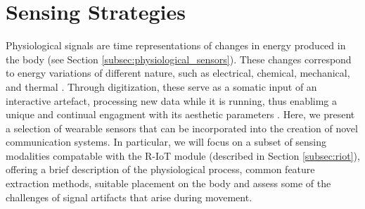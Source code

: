 %
%

\section{Sensing Strategies}
\label{sec:sensing}

Physiological signals are time representations of changes in energy produced in the body (see Section \ref{subsec:physiological_sensors}). These changes correspond to energy variations of different nature, such as electrical, chemical, mechanical, and thermal \cite{semmlow_biosignal_2014}. Through digitization, these serve as a somatic input of an interactive artefact, processing new data while it is running, thus enablimg a unique and continual engagment with its aesthetic parameters \cite{carvalhais_art_2022}. Here, we present a selection of wearable sensors that can be incorporated into the creation of novel communication systems. In particular, we will focus on a subset of sensing modalities compatable with the R-IoT module (described in Section \ref{subsec:riot}), offering a brief description of the physiological process, common feature extraction methods, suitable placement on the body and assess some of the challenges of signal artifacts that arise during movement.

